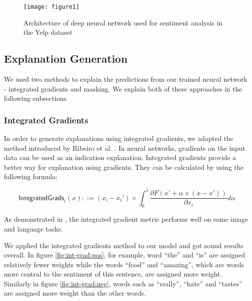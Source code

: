 \documentclass[11pt]{article}
\begin{document}
\begin{figure}
	\texttt{[image: figure1]}
	\caption{Architecture of deep neural network used for sentiment analysis in the Yelp dataset}
	\label{fig:dnn-arch}
\end{figure}

\subsection{Explanation Generation}

We used two methods to explain the predictions from our trained neural network - integrated gradients and masking. We explain both of these approaches in the following subsections.

\subsubsection{Integrated Gradients}

In order to generate explanations using integrated gradients, we adapted the method introduced by Ribeiro et al. \cite{Ribeiro2016}. In neural networks, gradients on the input data can be used as an indication explanation. Integrated gradients provide a better way for explanation using gradients. They can be calculated by using the following formula:

\[
	\mathsf{IntegratedGrads}_i(x) ::= (x_i - x_i') \times \int_0^1 \frac{\partial F(x' + \alpha \times (x - x'))}{\partial x_i} d\alpha
\]

As demonstrated in \cite{Ribeiro2016}, the integrated gradient metric performs well on some image and language tasks.

We applied the integrated gradients method to our model and got sound results overall. In figure \ref{fig:int-grad:pos}, for example, word ``the'' and ``is'' are assigned relatively fewer weights while the words ``food'' and ``amazing'', which are words more central to the sentiment of this sentence, are assigned more weight. Similarly in figure \ref{fig:int-grad:neg}, words such as ``really'', ``hate'' and ``tastes'' are assigned more weight than the other words.
\end{document}
